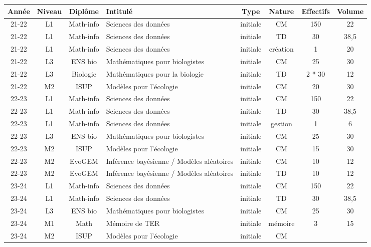 \begin{tabular}{|c|c|c|p{}|c|c|c|c|}
\hline
Année & Niveau & Diplôme & Intitulé & Type & Nature & Effectifs & Volume \\ 
\hline
\hline
21-22 & L1 & Math-info & Sciences des données & initiale & CM & 150 & 22 \\ 
21-22 & L1 & Math-info & Sciences des données & initiale & TD & 30 & 38,5 \\ 
21-22 & L1 & Math-info & Sciences des données & initiale & création & 1 & 20 \\ 
21-22 & L3 & ENS bio & Mathématiques pour biologistes & initiale & CM & 25 & 30 \\ 
21-22 & L3 & Biologie & Mathématiques pour la biologie & initiale & TD & 2 * 30 & 12 \\ 
21-22 & M2 & ISUP & Modèles pour l’écologie & initiale & CM & 20 & 30 \\ 
\hline
\hline
22-23 & L1 & Math-info & Sciences des données & initiale & CM & 150 & 22 \\ 
22-23 & L1 & Math-info & Sciences des données & initiale & TD & 30 & 38,5 \\ 
22-23 & L1 & Math-info & Sciences des données & initiale & gestion & 1 & 6 \\ 
22-23 & L3 & ENS bio & Mathématiques pour biologistes & initiale & CM & 25 & 30 \\ 
22-23 & M2 & ISUP & Modèles pour l’écologie & initiale & CM & 15 & 30 \\ 
22-23 & M2 & EvoGEM & Inférence bayésienne / Modèles aléatoires & initiale & CM & 10 & 12 \\ 
22-23 & M2 & EvoGEM & Inférence bayésienne / Modèles aléatoires & initiale & TD & 10 & 12 \\ 
\hline
\hline
23-24 & L1 & Math-info & Sciences des données & initiale & CM & 150 & 22 \\ 
23-24 & L1 & Math-info & Sciences des données & initiale & TD & 30 & 38,5 \\ 
23-24 & L3 & ENS bio & Mathématiques pour biologistes & initiale & CM & 25 & 30 \\ 
23-24 & M1 & Math & Mémoire de TER & initiale & mémoire & 3 & 15 \\ 
23-24 & M2 & ISUP & Modèles pour l’écologie & initiale & CM &  &  \\ 

\end{tabular}
